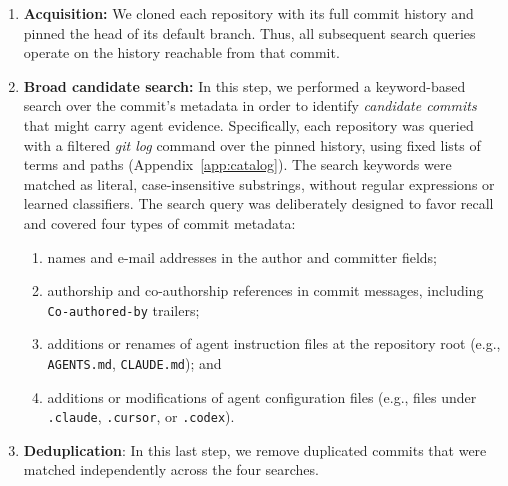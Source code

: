 \documentclass[smallextended,natbib]{svjour3}
\newcommand{\tool}[1]{\texttt{#1}}
\begin{document}
\begin{enumerate}[leftmargin=*]
\item \textbf{Acquisition:}  We cloned each repository with its full commit
history and pinned the head of its default branch.  Thus, all subsequent search queries
operate on the history reachable from that commit.  

\item \textbf{Broad candidate search:} In this step, 
we performed a  keyword-based search over the commit's metadata in order to identify \textit{candidate  commits} that might carry agent
evidence. Specifically, each repository was queried with a filtered \textit{git log} command over the pinned history, using fixed lists of terms and paths (Appendix~\ref{app:catalog}). The search keywords were matched as literal, case-insensitive substrings, without regular expressions or learned classifiers. The search query was deliberately designed to favor recall and covered four types of commit metadata:
  \begin{enumerate}[label=(\alph*)]
  \item names and e-mail addresses in the author and committer fields;
  \item authorship and co-authorship references in commit messages, including
  \tool{Co-authored-by} trailers;
  \item additions or renames of agent instruction files at the repository root
  (e.g., \tool{AGENTS.md}, \tool{CLAUDE.md}); and
  \item additions or modifications of agent configuration files (e.g., files
  under \tool{.claude}, \tool{.cursor}, or \tool{.codex}).
  \end{enumerate}
    \item \textbf{Deduplication}: In this last step, we  remove duplicated commits that were matched independently across the four
searches.
\end{enumerate}
\end{document}
